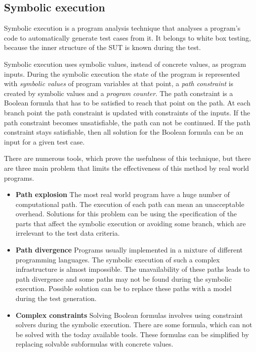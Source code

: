 
\subsection{Symbolic execution}
\label{ssub:symbolicexecution}

Symbolic execution is a program analysis technique that analyses a program’s code to automatically generate test cases from it. It belongs to white box testing, because the inner structure of the SUT is known during the test.

Symbolic execution uses symbolic values, instead of concrete values, as program inputs. During the symbolic execution the state of the program is represented with \textit{symbolic values} of program variables at that point, a \textit{path constraint} is created by symbolic values and a \textit{program counter}. The path constraint is a Boolean formula that has to be satisfied to reach that point on the path. At each branch point the path constraint is updated with constraints of the inputs. If the path constraint becomes unsatisfiable, the path can not be continued. If the path constraint stays satisfiable, then all solution for the Boolean formula can be an input for a given test case.

There are numerous tools, which prove the usefulness of this technique, but there are three main problem that limits the effectiveness of this method by real world programs.

\begin{itemize}
	\item \textbf{Path explosion} The most real world program have a huge number of computational path. The execution of each path can mean an unacceptable overhead. Solutions for this problem can be using the specification of the parts that affect the symbolic execution or avoiding some branch, which are irrelevant to the test data criteria.
	\item \textbf{Path divergence} Programs usually implemented in a mixture of different programming languages. The symbolic execution of such a complex infrastructure is almost impossible. The unavailability of these paths leads to path divergence and some paths may not be found during the symbolic execution. Possible solution can be to replace these paths with a model during the test generation.
	\item \textbf{Complex constraints} Solving Boolean formulas involves using constraint solvers during the symbolic execution. There are some formula, which can not be solved with the today available tools. These formulas can be simplified by replacing solvable subformulas with concrete values.
\end{itemize}


